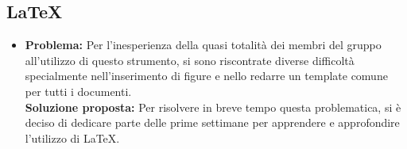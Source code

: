 \subsection{\LaTeX}
\begin{itemize}
	\item \textbf{Problema:} Per  l’inesperienza  della quasi totalità  dei  membri  del gruppo all'utilizzo di questo strumento, si sono riscontrate diverse difficoltà specialmente nell'inserimento di figure e nello redarre un template comune per tutti i documenti.\\
	\textbf{Soluzione proposta:} Per risolvere in breve tempo questa problematica, si è deciso di dedicare parte delle prime settimane per apprendere e approfondire l’utilizzo di \LaTeX.
\end{itemize}


